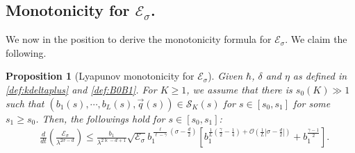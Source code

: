 \documentclass[11pt]{aims}
\newtheorem{proposition}[theorem]{Proposition}
\theoremstyle{definition}
\numberwithin{equation}{section}
\begin{document}
\subsection{Monotonicity for ${\mathscr{E}}_\sigma$.}
We now in the position to derive the monotonicity formula for ${\mathscr{E}}_\sigma$. We claim the following.
\begin{proposition}[Lyapunov monotonicity for ${\mathscr{E}}_\sigma$] \label{prop:Esigma} Given $\hbar$, $\delta$ and $\eta$ as defined in \eqref{def:kdeltaplus} and \eqref{def:B0B1}. For $K \geq 1$, we assume that there is $s_0(K) \gg 1$ such that $(b_1(s), \cdots, b_L(s), \vec q(s)) \in {\mathcal{S}}_K(s)$ for $s \in [s_0, s_1]$ for some $s_1 \geq s_0$. Then, the followings hold for $s \in [s_0, s_1]$:
\begin{align}
&\frac{d}{dt}\left(\frac{{\mathscr{E}}_{\sigma}}{\lambda^{2\sigma - d}} \right) \leq \frac{b_1}{\lambda^{2\Bbbk - d + 1}}\sqrt{{\mathscr{E}}_\sigma}b_1^{\frac{\ell}{\ell - \gamma}\left(\sigma - \frac d2\right)}\left[ b_1^{\frac{1}{L}\left(\frac{\gamma}{2} - \frac 14\right) + {\mathcal{O}}\left(\frac{1}{L}\left|\sigma - \frac d2\right|\right)} + b_1^{\frac{\gamma - 1}{2}} \right].\label{eq:Esigma}
\end{align}
\end{proposition}
\end{document}
